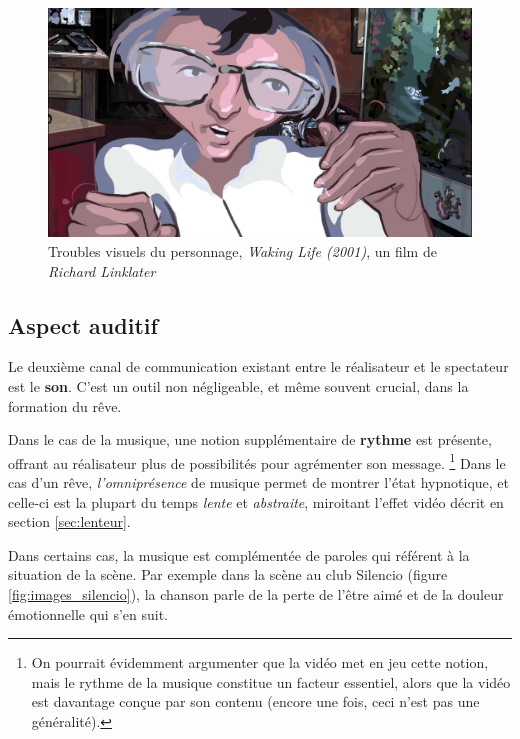 \documentclass[../main.tex]{subfile}
\begin{document}
\begin{figure}
    \centering
    \includegraphics[width=\linewidth]{images/trouble2}
    \caption{Troubles visuels du personnage, \textit{Waking Life (2001)}, un
             film de \textit{Richard Linklater}}
    \label{fig:images_trouble2}
\end{figure}

\subsection{Aspect auditif}

Le deuxième canal de communication existant entre le réalisateur et le
spectateur est le \textbf{son}. C'est un outil non négligeable, et même souvent
crucial, dans la formation du rêve.

Dans le cas de la musique, une notion supplémentaire de \textbf{rythme} est
présente, offrant au réalisateur plus de possibilités pour agrémenter son
message. \footnote{On pourrait évidemment argumenter que la vidéo met en jeu
cette notion, mais le rythme de la musique constitue un facteur essentiel,
alors que la vidéo est davantage conçue par son contenu (encore une fois,
ceci n'est pas une généralité).} Dans le cas d'un rêve, \emph{l'omniprésence}
de musique permet de montrer l'état hypnotique, et celle-ci est la plupart du
temps \emph{lente} et \emph{abstraite}, miroitant l'effet vidéo décrit en
section \ref{sec:lenteur}.

Dans certains cas, la musique est complémentée de paroles qui référent à la
situation de la scène. Par exemple dans la scène au club Silencio (figure
\ref{fig:images_silencio}), la chanson parle de la perte de l'être aimé et de la
douleur émotionnelle qui s'en suit. %

\end{document}
